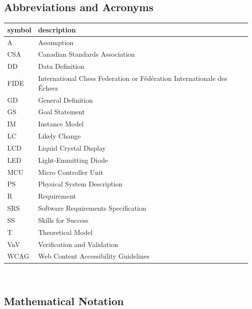 \documentclass[12pt]{article}
\begin{document}
\subsection{Abbreviations and Acronyms}
\begin{tabular}{l l} 
  \toprule		
  \textbf{symbol} & \textbf{description}\\
  \midrule 
  A & Assumption\\
  CSA & Canadian Standards Association\\
  DD & Data Definition\\
  FIDE & International Chess Federation or Fédération Internationale des Échecs\\
  GD & General Definition\\
  GS & Goal Statement\\
  IM & Instance Model\\
  LC & Likely Change\\
  LCD & Liquid Crystal Display\\
  LED & Light-Emmitting Diode\\
  MCU & Micro Controller Unit\\
  PS & Physical System Description\\
  R & Requirement\\
  SRS & Software Requirements Specification\\
  SS & Skills for Success\\
  T & Theoretical Model\\
  VnV & Verification and Validation\\
  WCAG & Web Content Accessibility Guidelines\\
  \bottomrule
\end{tabular}\\

\subsection{Mathematical Notation}
\end{document}
